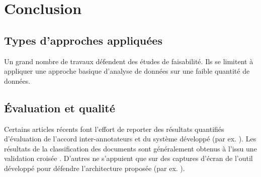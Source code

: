 \section{Conclusion}
\label{sec:literature:conclusion}
\subsection{Types d'approches appliquées}
Un grand nombre de travaux défendent des études de faisabilité. Ils se limitent à appliquer une approche basique d'analyse de données sur une faible quantité de données.


\subsection{Évaluation et qualité}
 Certains articles récents font l'effort de reporter des résultats quantifiés d'évaluation de l'accord inter-annotateurs et du système développé (par ex. \citep{Shulayeva2017recognfactprincip}). Les résultats de la classification des documents sont généralement obtenus à l'issu une validation croisée \cite{Sulea2017predictareadecision,sulea2017legalEnsSVM,Aletras2016predictDecisionECHR}. D'autres ne s'appuient que sur des captures d'écran de l'outil développé pour défendre l'architecture proposée (par ex. \citep{wyner2010extractlegalelts,Waltl2016lexia}).


